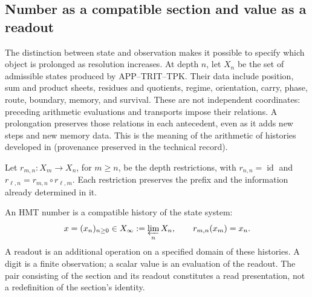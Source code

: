 
\subsection{Number as a compatible section and value as a readout}
\label{hist:seccion}

The distinction between state and observation makes it possible to specify which object is
prolonged as resolution increases. At depth \(n\), let \(X_n\)
be the set of admissible states produced by APP--TRIT--TPK. Their data
include position, sum and product sheets, residues and quotients, regime,
orientation, carry, phase, route, boundary, memory, and survival. These are not
independent coordinates: preceding arithmetic evaluations and transports
impose their relations. A prolongation preserves those relations
in each antecedent, even as it adds new steps and new memory data.
This is the meaning of the arithmetic of histories developed in
\textup{(provenance preserved in the technical record)}.

Let \(r_{m,n}:X_m\to X_n\), for \(m\geq n\), be the depth
restrictions, with \(r_{n,n}=\operatorname{id}\) and
\(r_{\ell,n}=r_{m,n}\circ r_{\ell,m}\). Each restriction preserves the
prefix and the information already determined in it.

\begin{definition}
An HMT number is a compatible history of the state system:
\begin{equation}
 x=(x_n)_{n\geq0}\in X_\infty:=\varprojlim_n X_n,
 \qquad r_{m,n}(x_m)=x_n.
 \label{hist:limite-inverso}
\end{equation}
A readout is an additional operation on a specified domain of these
histories. A digit is a finite observation; a scalar value is an
evaluation of the readout. The pair consisting of the section and its readout constitutes
a read presentation, not a redefinition of the section's identity.
\end{definition}

